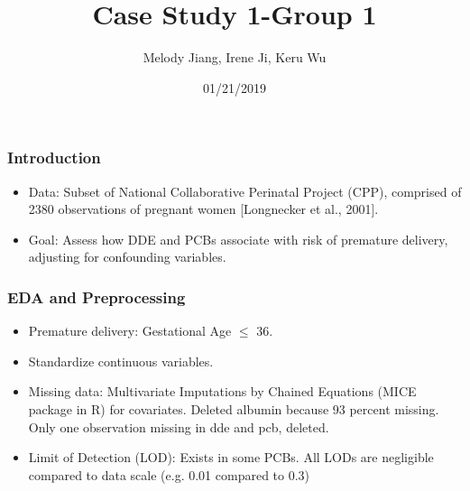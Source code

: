 \documentclass{beamer}
\title{Case Study 1-Group 1}
\author{Melody Jiang, Irene Ji, Keru Wu}
\institute{Department of Statistical Science, Duke University}
\date{01/21/2019}
\begin{document}
\frame{\titlepage}





\begin{frame}
\frametitle{Introduction}

\begin{itemize}
\item Data: Subset of National Collaborative Perinatal Project (CPP), comprised of 2380 observations of pregnant women [Longnecker et al., 2001].
  
\item Goal: Assess how DDE and PCBs associate with risk of premature delivery, adjusting for confounding variables.

\end{itemize}

\end{frame}







\begin{frame}
\frametitle{EDA and Preprocessing}
\begin{itemize}
\item Premature delivery: Gestational Age $\leq$ 36.
\item Standardize continuous variables.
\item Missing data: Multivariate Imputations by Chained Equations (MICE package in R) for covariates. Deleted albumin because 93 percent missing. Only one observation missing in dde and pcb, deleted.
\item Limit of Detection (LOD): Exists in some PCBs. All LODs are negligible compared to data scale (e.g. 0.01 compared to 0.3)
\end{itemize}
\end{frame}
\end{document}
